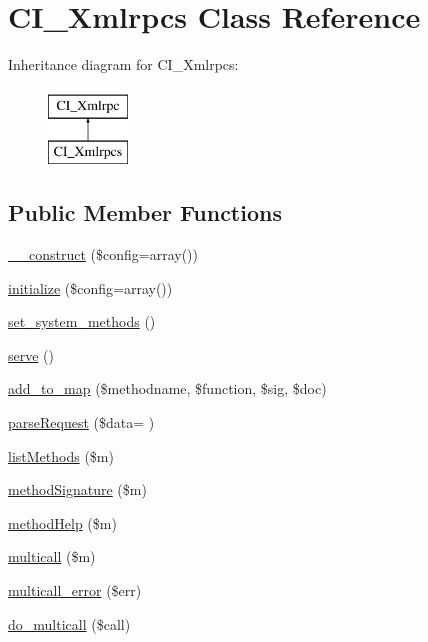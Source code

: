 \hypertarget{class_c_i___xmlrpcs}{}\section{C\+I\+\_\+\+Xmlrpcs Class Reference}
\label{class_c_i___xmlrpcs}
Inheritance diagram for C\+I\+\_\+\+Xmlrpcs\+:\begin{figure}[H]
\begin{center}
\leavevmode
\includegraphics[height=2.000000cm]{class_c_i___xmlrpcs}
\end{center}
\end{figure}
\subsection*{Public Member Functions}
\begin{DoxyCompactItemize}
\item 
\hyperlink{class_c_i___xmlrpcs_af7f9493844d2d66e924e3c1df51ce616}{\+\_\+\+\_\+construct} (\$config=array())
\item 
\hyperlink{class_c_i___xmlrpcs_a481385e36d920f5a5005ace05c6cd016}{initialize} (\$config=array())
\item 
\hyperlink{class_c_i___xmlrpcs_a858a05529612358b8f63c88b08b414d0}{set\+\_\+system\+\_\+methods} ()
\item 
\hyperlink{class_c_i___xmlrpcs_aa9e0b443b9575f62bf9f8e85b1742c96}{serve} ()
\item 
\hyperlink{class_c_i___xmlrpcs_a73b29191620c55a5e2d3fda3a5c3cf44}{add\+\_\+to\+\_\+map} (\$methodname, \$function, \$sig, \$doc)
\item 
\hyperlink{class_c_i___xmlrpcs_aacf67c6a5831279da007d4d3f0de5312}{parse\+Request} (\$data= \textquotesingle{}\textquotesingle{})
\item 
\hyperlink{class_c_i___xmlrpcs_ad640f0b44d1956a05cfe40bab4e4043d}{list\+Methods} (\$m)
\item 
\hyperlink{class_c_i___xmlrpcs_a9f96cc0bd3338094174eb22cd90d6f2a}{method\+Signature} (\$m)
\item 
\hyperlink{class_c_i___xmlrpcs_a97626f30e860f4a63463f8674827dc00}{method\+Help} (\$m)
\item 
\hyperlink{class_c_i___xmlrpcs_a122ce829a1aa3f0041f922ec5feb95c8}{multicall} (\$m)
\item 
\hyperlink{class_c_i___xmlrpcs_a4cf545e6c15e1487b223346b18ca017d}{multicall\+\_\+error} (\$err)
\item 
\hyperlink{class_c_i___xmlrpcs_ab76189ac2d65f1e3ab6d65128e3748d5}{do\+\_\+multicall} (\$call)
\end{DoxyCompactItemize}
